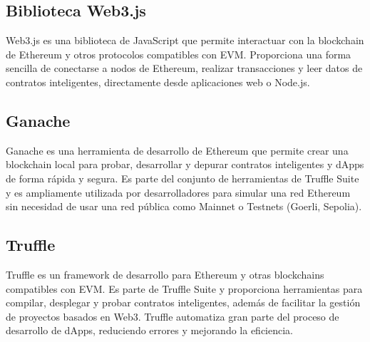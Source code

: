 







\subsection{Biblioteca Web3.js}

Web3.js \citep{web3} es una biblioteca de JavaScript que permite interactuar con la blockchain de Ethereum y otros protocolos compatibles con EVM. Proporciona una forma sencilla de conectarse a nodos de Ethereum, realizar transacciones y leer datos de contratos inteligentes, directamente desde aplicaciones web o Node.js.


\subsection{Ganache}

Ganache \cite{ganache_website} es una herramienta de desarrollo de Ethereum que permite crear una blockchain local para probar, desarrollar y depurar contratos inteligentes y dApps de forma rápida y segura. Es parte del conjunto de herramientas de Truffle Suite y es ampliamente utilizada por desarrolladores para simular una red Ethereum sin necesidad de usar una red pública como Mainnet o Testnets (Goerli, Sepolia).


\subsection{Truffle}

Truffle \cite{truffle_website} es un framework de desarrollo para Ethereum y otras blockchains compatibles con EVM. Es parte de Truffle Suite y proporciona herramientas para compilar, desplegar y probar contratos inteligentes, además de facilitar la gestión de proyectos basados en Web3. Truffle automatiza gran parte del proceso de desarrollo de dApps, reduciendo errores y mejorando la eficiencia.


